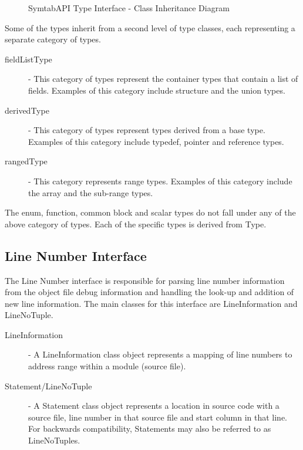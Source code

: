 \begin{figure}
     \caption{SymtabAPI Type Interface - Class Inheritance Diagram}
     \label{fig:class-inherit}
 \end{figure}

Some of the types inherit from a second level of type classes, each representing a separate category of types. 
\begin{description}
\item[fieldListType] - This category of types represent the container types that contain a list of fields. Examples of this category include structure and the union types. 
\item[derivedType] - This category of types represent types derived from a base type. Examples of this category include typedef, pointer and reference types. 
\item[rangedType] - This category represents range types. Examples of this category include the array and the sub-range types. 
\end{description}
The enum, function, common block and scalar types do not fall under any of the above category of types. Each of the specific types is derived from Type.

\subsection{Line Number Interface}

The Line Number interface is responsible for parsing line number information from the object file debug information and handling the look-up and addition of new line information. The main classes for this interface are LineInformation and LineNoTuple. 

\begin{description}
\item[LineInformation] - A LineInformation class object represents a mapping of line numbers to address range within a module (source file). 
\item[Statement/LineNoTuple] - A Statement class object represents a location in source code with a source file, line number in that source file and start column in that line. For backwards compatibility, Statements may also be referred to as LineNoTuples. 
\end{description}

